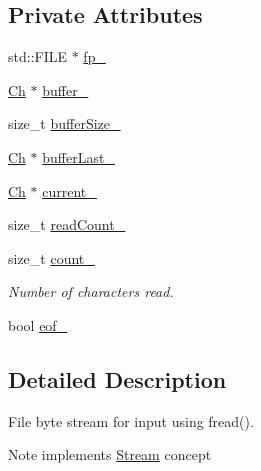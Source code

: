 \subsection*{Private Attributes}
\begin{DoxyCompactItemize}
\item 
std\+::\+F\+I\+LE $\ast$ \mbox{\hyperlink{classrapidjson_1_1_file_read_stream_accd951049f91a32dd700414754584200}{fp\+\_\+}}
\item 
\mbox{\hyperlink{classrapidjson_1_1_file_read_stream_a4a5f34875b40d22def206c9a09ecd929}{Ch}} $\ast$ \mbox{\hyperlink{classrapidjson_1_1_file_read_stream_a2f3504c8367c843d1f11a21c7547dafb}{buffer\+\_\+}}
\item 
size\+\_\+t \mbox{\hyperlink{classrapidjson_1_1_file_read_stream_ad05522d27865a351ae61e006b753cbd1}{buffer\+Size\+\_\+}}
\item 
\mbox{\hyperlink{classrapidjson_1_1_file_read_stream_a4a5f34875b40d22def206c9a09ecd929}{Ch}} $\ast$ \mbox{\hyperlink{classrapidjson_1_1_file_read_stream_a2cee7bdbbb0b2675076873bc93a3cb65}{buffer\+Last\+\_\+}}
\item 
\mbox{\hyperlink{classrapidjson_1_1_file_read_stream_a4a5f34875b40d22def206c9a09ecd929}{Ch}} $\ast$ \mbox{\hyperlink{classrapidjson_1_1_file_read_stream_a2677bd57c31c6488e2b1b8559240a105}{current\+\_\+}}
\item 
size\+\_\+t \mbox{\hyperlink{classrapidjson_1_1_file_read_stream_a2e36a566d23ef19ffa4eb16e0a390cff}{read\+Count\+\_\+}}
\item 
size\+\_\+t \mbox{\hyperlink{classrapidjson_1_1_file_read_stream_aa9f5c84ba27299caf94ef0022f8d9464}{count\+\_\+}}
\begin{DoxyCompactList}\small\item\em Number of characters read. \end{DoxyCompactList}\item 
bool \mbox{\hyperlink{classrapidjson_1_1_file_read_stream_adee210f3c66e6a05a61379b1e6835f09}{eof\+\_\+}}
\end{DoxyCompactItemize}


\subsection{Detailed Description}
File byte stream for input using fread(). 

\begin{DoxyNote}{Note}
implements \mbox{\hyperlink{classrapidjson_1_1_stream}{Stream}} concept 
\end{DoxyNote}


